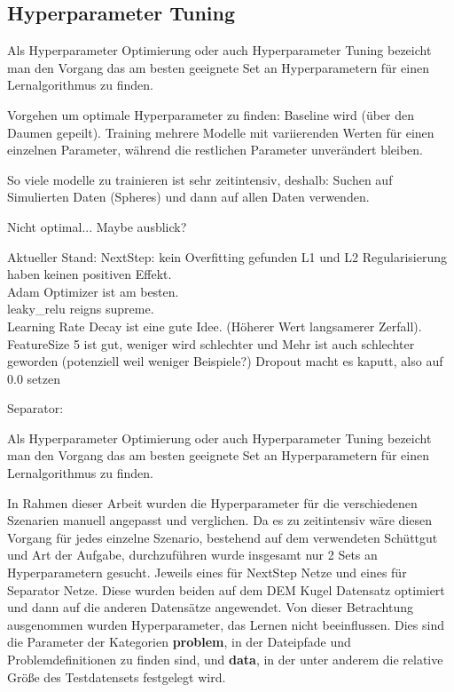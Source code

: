 \subsection{Hyperparameter Tuning}

\color{blue}
Als Hyperparameter Optimierung oder auch Hyperparameter Tuning bezeicht man den Vorgang das am besten geeignete Set an 
Hyperparametern für einen Lernalgorithmus zu finden.

Vorgehen um optimale Hyperparameter zu finden: 
Baseline wird (über den Daumen gepeilt).
Training mehrere Modelle mit variierenden Werten für einen einzelnen Parameter, 
während die restlichen Parameter unverändert bleiben.

So viele modelle zu trainieren ist sehr zeitintensiv, deshalb:
Suchen auf Simulierten Daten (Spheres) und dann auf allen Daten verwenden.

Nicht optimal... Maybe ausblick?


Aktueller Stand:
NextStep: kein Overfitting gefunden \textrightarrow L1 und L2 Regularisierung haben keinen positiven Effekt.\\
Adam Optimizer ist am besten.  \\
leaky\_relu reigns supreme. \\
Learning Rate Decay ist eine gute Idee. (Höherer Wert \textrightarrow langsamerer Zerfall). \\
FeatureSize 5 ist gut, weniger wird schlechter und Mehr ist auch schlechter geworden (potenziell weil weniger Beispiele?)
Dropout macht es kaputt, also auf 0.0 setzen

Separator:
\color{black}

Als Hyperparameter Optimierung oder auch Hyperparameter Tuning bezeicht man den Vorgang das am besten geeignete Set an 
Hyperparametern für einen Lernalgorithmus zu finden.

In Rahmen dieser Arbeit wurden die Hyperparameter für die verschiedenen Szenarien manuell angepasst und verglichen.
Da es zu zeitintensiv wäre diesen Vorgang für jedes einzelne Szenario, bestehend auf dem verwendeten Schüttgut und Art der Aufgabe, durchzuführen
wurde insgesamt nur 2 Sets an Hyperparametern gesucht.
Jeweils eines für NextStep Netze und eines für Separator Netze.
Diese wurden beiden auf dem DEM Kugel Datensatz optimiert und dann auf die anderen Datensätze angewendet.
Von dieser Betrachtung ausgenommen wurden Hyperparameter, das Lernen nicht beeinflussen.
Dies sind die Parameter der Kategorien {\sffamily \textbf{problem}}, in der Dateipfade und Problemdefinitionen zu finden sind, 
und {\sffamily \textbf{data}}, in der unter anderem die relative Größe des Testdatensets festgelegt wird.



